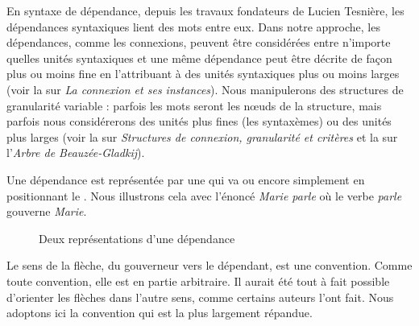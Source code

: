 En syntaxe de dépendance, depuis les travaux fondateurs de Lucien Tesnière, les dépendances syntaxiques lient des mots entre eux. Dans notre approche, les dépendances, comme les connexions, peuvent être considérées entre n’importe quelles unités syntaxiques et une même dépendance peut être décrite de façon plus ou moins fine en l’attribuant à des unités syntaxiques plus ou moins larges (voir la  sur \textit{La connexion et ses instances}). Nous manipulerons des structures de granularité variable : parfois les mots seront les nœuds de la structure, mais parfois nous considérerons des unités plus fines (les syntaxèmes) ou des unités plus larges (voir la  sur \textit{Structures de connexion, granularité et critères} et la  sur l’\textit{Arbre de Beauzée-Gladkij}).

Une dépendance est représentée par une  qui va  ou encore simplement en positionnant le . Nous illustrons cela avec l’énoncé \textit{Marie parle} où le verbe \textit{parle} gouverne \textit{Marie}.

\begin{figure}
\hspace{2cm}
\caption{Deux représentations d’une dépendance}
\end{figure}

Le sens de la flèche, du gouverneur vers le dépendant, est une convention. Comme toute convention, elle est en partie arbitraire. Il aurait été tout à fait possible d’orienter les flèches dans l’autre sens, comme certains auteurs l’ont fait. Nous adoptons ici la convention qui est la plus largement répandue.

